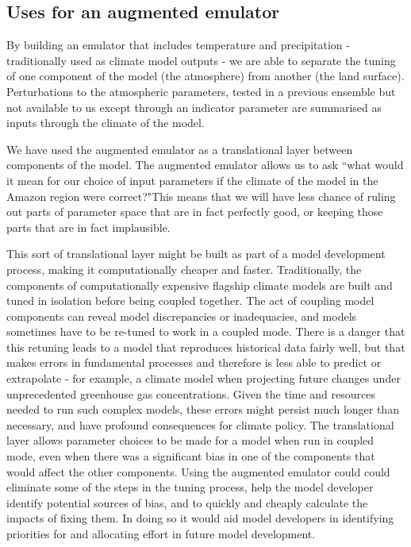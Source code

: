 \documentclass[gmd, manuscript]{copernicus}
\begin{document}
\subsection{Uses for an augmented emulator}
By building an emulator that includes temperature and precipitation - traditionally used as climate model outputs - we are able to separate the tuning of one component of the model (the atmosphere) from another (the land surface). Perturbations to the atmospheric parameters, tested in a previous ensemble but not available to us except through an indicator parameter  are summarised as inputs through the climate of the model.

We have used the augmented emulator as a translational layer between components of the model. The augmented emulator allows us to ask ``what would it mean for our choice of input parameters if the climate of the model in the Amazon region were correct?"This means that we will have less chance of ruling out parts of parameter space that are in fact perfectly good, or keeping those parts that are in fact implausible.

This sort of translational layer might be built as part of a model development process, making it computationally cheaper and faster. Traditionally, the components of computationally expensive flagship climate models are built and tuned in isolation before being coupled together. The act of coupling model components can reveal model discrepancies or inadequacies, and models sometimes have to be re-tuned to work in a coupled mode. There is a danger that this retuning leads to a model that reproduces historical data fairly well, but that makes errors in fundamental processes and therefore is less able to predict or extrapolate - for example, a climate model when projecting future changes under unprecedented greenhouse gas concentrations. Given the time and resources needed to run such complex models, these errors might persist much longer than necessary, and have profound consequences for climate policy. The translational layer allows parameter choices to be made for a model when run in coupled mode, even when there was a significant bias in one of the components that would affect the other components. Using the augmented emulator could could eliminate some of the steps in the tuning process, help the model developer identify potential sources of bias, and to quickly and cheaply calculate the impacts of fixing them. In doing so it would aid model developers in identifying priorities for and allocating effort in future model development.
\end{document}
